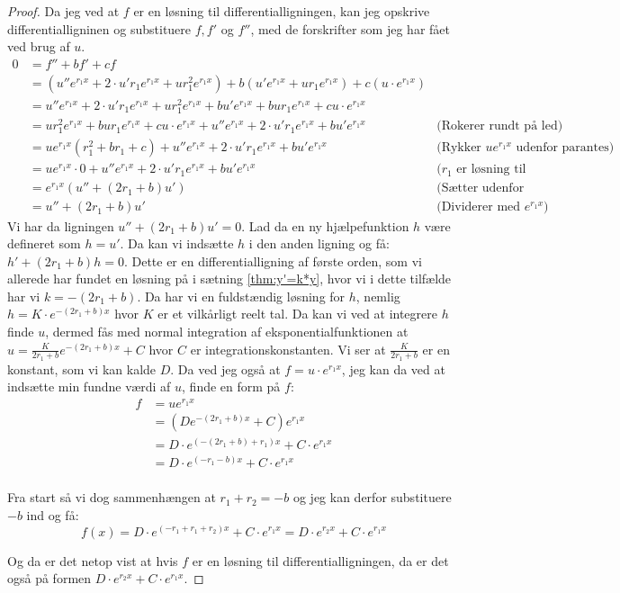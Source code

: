 \begin{proof}
Da jeg ved at $f$ er en løsning til differentialligningen, kan jeg opskrive differentialligninen og substituere $f, f'$ og $f''$, med de forskrifter som jeg har fået ved brug af $u$. 
\begin{align*}
0 	&= f'' + bf' + cf \\
	&= (u''e^{r_1 x} + 2\cdot u' r_1 e^{r_1 x} + u r_1^2 e^{r_1 x}) + b(u'e^{r_1 x} + ur_1 e^{r_1 x}) + c (u \cdot e^{r_1 x})\\
	&= u''e^{r_1 x} + 2\cdot u' r_1 e^{r_1 x} + u r_1^2 e^{r_1 x} + bu'e^{r_1 x} + bur_1 e^{r_1 x} + cu \cdot e^{r_1 x}\\
	&= u r_1^2 e^{r_1 x} + bur_1 e^{r_1 x} + cu \cdot e^{r_1 x} + u''e^{r_1 x} + 2\cdot u' r_1 e^{r_1 x} + bu'e^{r_1 x}  & \text{(Rokerer rundt på led)}\\
	&= ue^{r_1 x}(r_1^2  + br_1 + c) + u''e^{r_1 x} + 2\cdot u' r_1 e^{r_1 x} + bu'e^{r_1 x} & \text{(Rykker $ue^{r_1 x}$ udenfor  parantes)}\\
	&= ue^{r_1 x} \cdot 0+ u''e^{r_1 x} + 2\cdot u' r_1 e^{r_1 x} + bu'e^{r_1 x} & \text{($r_1$ er løsning til karakterligningen)}\\
	&= e^{r_1 x} (u'' + (2r_1 + b)u') & \text{(Sætter udenfor parantes)}\\
	&= u'' + (2r_1 + b)u' & \text{(Dividerer med $e^{r_1 x}$)}
\end{align*}
Vi har da ligningen $u'' + (2r_1 + b)u' = 0$. 
Lad da en ny hjælpefunktion $h$ være defineret som $h = u'$. 
Da kan vi indsætte $h$ i den anden ligning og få:
$h' + (2r_1 + b)h = 0$. 
Dette er en differentialligning af første orden, som vi allerede har fundet en løsning på i sætning \ref{thm:y'=k*y}, 
hvor vi i dette tilfælde har vi $k = -(2r_1 + b)$.
Da har vi en fuldstændig løsning for $h$, nemlig $h=K \cdot e^{-(2r_1 + b)x}$ hvor $K$ er et vilkårligt reelt tal. 
Da kan vi ved at integrere $h$ finde $u$, dermed fås med normal integration af eksponentialfunktionen at $u = \frac{K}{2r_1 + b} e^{-(2r_1 + b)x} + C$ hvor $C$ er integrationskonstanten. 
Vi ser at $\frac{K}{2r_1 + b}$ er en konstant, som vi kan kalde $D$.
Da ved jeg også at $f=u\cdot e^{r_1 x}$, jeg kan da ved at indsætte min fundne værdi af $u$, finde en form på $f$:
\begin{align*}
f 	&= ue^{r_1 x}\\
	&= (D e^{-(2r_1 + b)x} + C)e^{r_1 x} \\
	&= D \cdot e^{(-(2r_1 + b)+r_1)x} + C\cdot e^{r_1 x}\\
	&= D \cdot e^{(-r_1 - b)x} + C\cdot e^{r_1 x}\\
\end{align*}

Fra start så vi dog sammenhængen at $r_1 + r_2 = -b$ og jeg kan derfor substituere $-b$ ind og få:
$$f(x) = D \cdot e^{(-r_1 +r_1 + r_2)x} + C\cdot e^{r_1 x}= D \cdot e^{r_2 x} + C\cdot e^{r_1 x}$$

Og da er det netop vist at hvis $f$ er en løsning til differentialligningen, da er det også på formen $D \cdot e^{r_2 x} + C\cdot e^{r_1 x}$.
\end{proof}